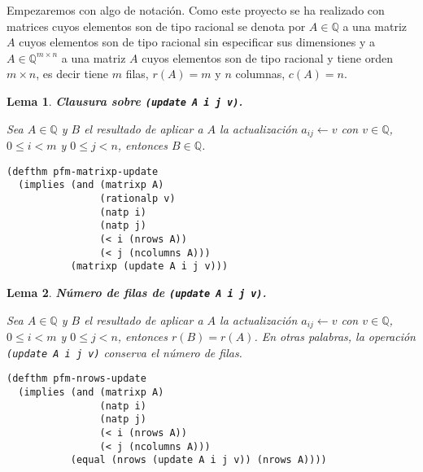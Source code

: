 \documentclass[a4paper,10pt]{article}
\newcommand{\Q}[1]{#1 \in \mathbb{Q}}
\newcommand{\M}[3]{#1 \in \mathbb{Q}^{#2 \times #3}}
\newtheorem{lema}{{Lema}}
\begin{document}
Empezaremos con algo de notación. Como este proyecto se ha realizado con matrices cuyos elementos son de tipo racional se denota por $\Q{A}$ a una matriz $A$ cuyos elementos son de tipo racional sin especificar sus dimensiones y a $\M{A}{m}{n}$ a una matriz $A$ cuyos elementos son de tipo racional y tiene orden $m \times n$, es decir tiene $m$ filas, $r(A) = m$ y $n$ columnas, $c(A) = n$.

\par \vspace{10pt}

\begin{lema} \textbf{Clausura sobre \texttt{(update A i j v)}.}\vspace{8pt}\par
Sea $\Q{A}$ y $B$ el resultado de aplicar a $A$ la actualización $a_{ij} \leftarrow v$ con $\Q{v}$, $0 \leq i < m$ y $0 \leq j < n$, entonces $\Q{B}$.
\end{lema}

\begin{lstlisting}[language=clips]
(defthm pfm-matrixp-update
  (implies (and (matrixp A)
                (rationalp v)
                (natp i)
                (natp j)
                (< i (nrows A))
                (< j (ncolumns A)))
           (matrixp (update A i j v)))
\end{lstlisting}

\par \vspace{16pt}

\begin{lema} \textbf{Número de filas de \texttt{(update A i j v)}.}\vspace{8pt}\par
Sea $\Q{A}$ y $B$ el resultado de aplicar a $A$ la actualización $a_{ij} \leftarrow v$ con $\Q{v}$, $0 \leq i < m$ y $0 \leq j < n$, entonces $r(B) = r(A)$. En otras palabras, la operación \texttt{(update A i j v)} \emph{conserva} el número de filas.
\end{lema}

\begin{lstlisting}[language=clips]
(defthm pfm-nrows-update
  (implies (and (matrixp A)
                (natp i)
                (natp j)
                (< i (nrows A))
                (< j (ncolumns A)))
           (equal (nrows (update A i j v)) (nrows A))))
\end{lstlisting}

\par \vspace{16pt}
\end{document}
